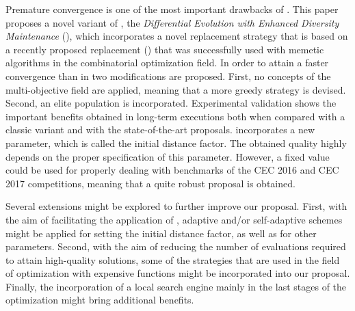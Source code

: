 Premature convergence is one of the most important drawbacks of \DE{}.
%
This paper proposes a novel variant of \DE{}, the \textit{Differential Evolution with Enhanced Diversity Maintenance} (\DEEDM{}),
which incorporates a novel replacement strategy that is based on a recently proposed replacement (\RMDDC{}) that was successfully
used with memetic algorithms in the combinatorial optimization field.
%
In order to attain a faster convergence than in \RMDDC{} two modifications are proposed.
%
First, no concepts of the multi-objective field are applied, meaning that a more greedy strategy is devised.
%
Second, an elite population is incorporated.
%
Experimental validation shows the important benefits obtained in long-term executions both when compared with a classic \DE{} variant and with
the state-of-the-art proposals.
%
\DEEDM{} incorporates a new parameter, which is called the initial distance factor.
%
The obtained quality highly depends on the proper specification of this parameter.
%
However, a fixed value could be used for properly dealing with benchmarks of the CEC 2016 and CEC 2017 competitions,
meaning that a quite robust proposal is obtained.

Several extensions might be explored to further improve our proposal.
%
First, with the aim of facilitating the application of \DEEDM{}, adaptive and/or self-adaptive schemes might be applied for setting the initial distance
factor, as well as for other \DE{} parameters.
%
Second, with the aim of reducing the number of evaluations required to attain high-quality solutions, some of the strategies that are used in the
field of optimization with expensive functions might be incorporated into our proposal.
%
Finally, the incorporation of a local search engine mainly in the last stages of the optimization might bring additional benefits.
